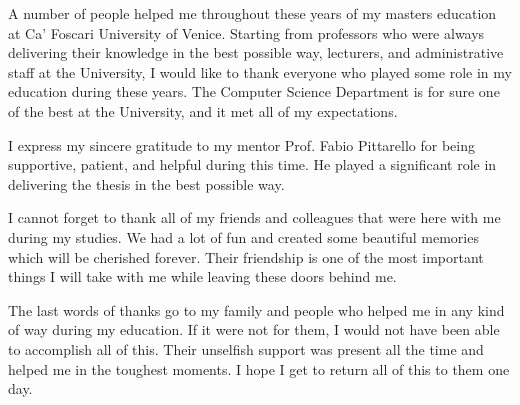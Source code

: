 \documentclass[draft,final]{vutinfth} %
\begin{document}
    \frontmatter %


    


    \begin{acknowledgements*}
        A number of people helped me throughout these years of my masters education at
        Ca' Foscari University of Venice. Starting from professors who were always delivering
        their knowledge in the best possible way, lecturers, and administrative staff at the University,
        I would like to thank everyone who played some role in my education during these years.
        The Computer Science Department is for sure one of the best at the University,
        and it met all of my expectations.

        I express my sincere gratitude to my mentor Prof. Fabio Pittarello for being
        supportive, patient, and helpful during this time. He played a significant role in
        delivering the thesis in the best possible way.

        I cannot forget to thank all of my friends and colleagues that were here with me
        during my studies. We had a lot of fun and created some beautiful memories
        which will be cherished forever. Their friendship is one of the most important things
        I will take with me while leaving these doors behind me.

        The last words of thanks go to my family and people who helped me in any kind of
        way during my education. If it were not for them, I would not have been able to accomplish
        all of this. Their unselfish support was present all the time and helped me in the
        toughest moments. I hope I get to return all of this to them one day.
    \end{acknowledgements*}
\end{document}
